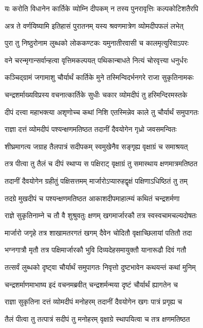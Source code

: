 \twolineshloka
{यः करोति विधानेन कार्तिके व्योम्नि दीपकम्}
{न तस्य पुनरावृत्तिः कल्पकोटिशतैरपि} %

\twolineshloka
{अत्र ते वर्णयिष्यामि इतिहासं पुरातनम्}
{यस्य श्रवणमात्रेण व्योमदीपफलं लभेत्} %

\twolineshloka
{पुरा तु निष्ठुरोनाम लुब्धको लोककण्टकः}
{यमुनातीरवासी च कालमृत्युरिवाऽपरः} %

\twolineshloka
{वने चरन्मृगान्सर्वान्हत्वा वृत्तिमकल्पयत्}
{पथिकान्बाधते नित्यं चोरवृत्त्या धनुर्धरः} %

\twolineshloka
{कञ्चिद्ग्रामं जगामाशु चौर्यार्थं कार्तिके मुने}
{तस्मिन्विदर्भनगरे राजा सुकृतिनामकः} %

\twolineshloka
{चन्द्रशर्माख्यविप्रस्य वचनात्कार्तिके सुधीः}
{चकार व्योमदीपं तु हरिमन्दिरमस्तके} %

\twolineshloka
{दीपं दत्त्वा महाभक्त्या अशृणोच्च कथां निशि}
{एतस्मिन्नेव काले तु चौर्यार्थं समुपागतः} %

\twolineshloka
{राज्ञा दत्तं व्योमदीपं पश्यन्क्षणमतिष्ठत}
{तदानीं दैवयोगेन गृध्रो जवसमन्वितः} %

\twolineshloka
{शीघ्रमागत्य जग्राह तैलपात्रं सदीपकम्}
{स्वमुखेनैव सङ्गृह्य वृक्षाग्रं च समाश्रयत्} %

\twolineshloka
{तत्र पीत्वा तु तैलं च दीपं स्थाप्य स पक्षिराट्}
{वृक्षाग्रं तु समास्थाय क्षणमात्रमतिष्ठत} %

\twolineshloka
{तदानीं दैवयोगेन ग्रहीतुं पक्षिसत्तमम्}
{मार्जारोऽप्यारुहद्वृक्षं पक्षिणाऽधिष्ठितं तु तम्} %

\twolineshloka
{तदग्रे मुखदीपं च पश्यन्क्षणमतिष्ठत}
{आकाशदीपमाहात्म्यं कथितं चन्द्रशर्मणा} %

\twolineshloka
{राज्ञे सुकृतिनाम्ने च तौ वै शुश्रुवतुः क्षणम्}
{खगमार्जारकौ तत्र स्वस्वचामचल्यदोषतः} %

\twolineshloka
{मार्जारो जगृहे तत्र शाखामतरगतं खगम्}
{दैवेन चोदितौ वृक्षाच्छिलायां पतितौ तदा} %

\twolineshloka
{भग्नगात्रौ मृतौ तत्र पक्षिमार्जारकौ भुवि}
{दिव्यदेहसमायुक्तौ यानारूढौ दिवं गतौ} %

\twolineshloka
{तत्सर्वं लुब्धको दृष्ट्वा चौर्यार्थं समुपागतः}
{निवृत्तो दुष्टभावेन कथयन्तं कथां मुनिम्} %

\twolineshloka
{चन्द्रशर्माणमाभाष्य इदं वचनमब्रवीत्}
{चन्द्रशर्मन्मया दृष्टं चौर्यार्थं ह्यागतेन च} %

\twolineshloka
{राज्ञा सुकृतिना दत्तं व्योमदीपं मनोहरम्}
{तदानीं दैवयोगेन खगः पात्रं प्रगृह्य च} %

\twolineshloka
{तैलं पीत्वा तु तत्पात्रं सदीपं तु मनोहरम्}
{वृक्षाग्रे स्थापयित्वा च तत्र क्षणमतिष्ठत} %

